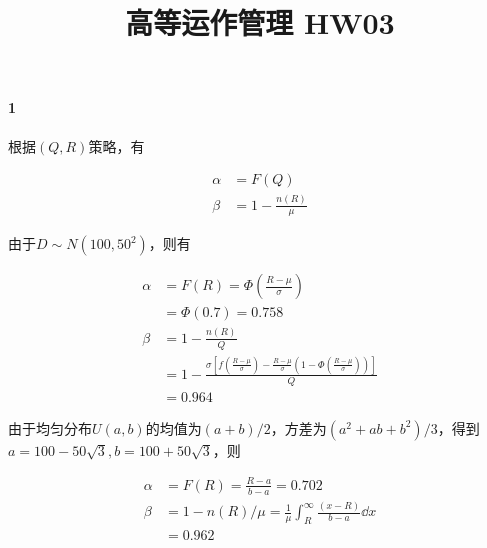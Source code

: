 \documentclass{../notes}
\title{高等运作管理 HW03}
\begin{document}
    \maketitle
    \paragraph*{1}

    根据$(Q, R)$策略，有

    \begin{equation}
        \begin{aligned}
            \alpha &= F(Q) \\
            \beta &= 1 - \frac{n(R)}{\mu}
        \end{aligned}
    \end{equation}

    \begin{subquestions}
        \item 由于$D\sim N(100, 50^2)$，则有

        \begin{equation}
            \begin{aligned}
                \alpha &= F(R) = \Phi\left(\frac{R - \mu}{\sigma}\right) \\
                &= \Phi(0.7) = 0.758 \\
                \beta &= 1 - \frac{n(R)}{Q} \\
                &= 1 - \frac{\sigma\left[f\left(\frac{R-\mu}{\sigma}\right) - \frac{R-\mu}{\sigma}\left(1 - \Phi\left(\frac{R-\mu}{\sigma}\right)\right)\right]}{Q} \\
                &= 0.964
            \end{aligned}
        \end{equation}
        \item 由于均匀分布$U(a, b)$的均值为$(a + b) / 2$，方差为$(a^2 + ab + b^2)/3$，得到$a=100-50\sqrt3, b=100+50\sqrt 3$，则

        \begin{equation}
            \begin{aligned}
                \alpha &= F(R) = \frac{R-a}{b-a} = 0.702 \\
                \beta &= 1 - n(R)/\mu = \frac{1}{\mu}\int_R^\infty \frac{(x-R)}{b-a} \dd x \\
                &= 0.962
            \end{aligned}
        \end{equation}
    \end{subquestions}
\end{document}
